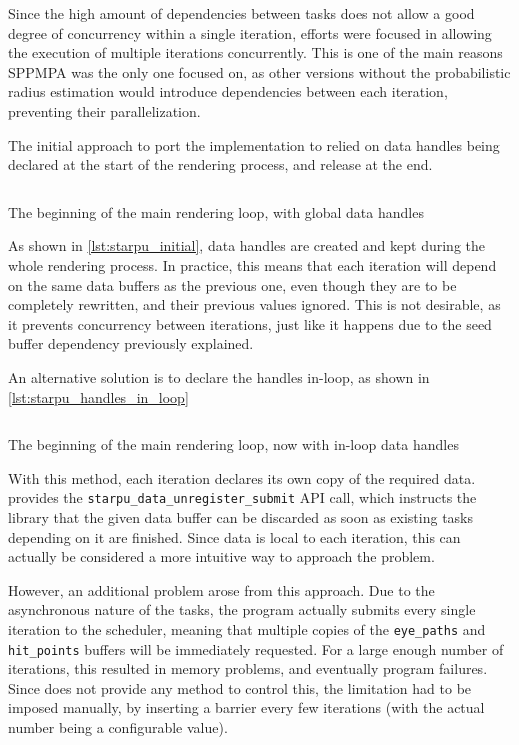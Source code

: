 \documentclass[main.tex]{subfiles}
\begin{document}
Since the high amount of dependencies between tasks does not allow a good degree of concurrency within a single iteration, efforts were focused in allowing the execution of multiple iterations concurrently. This is one of the main reasons SPPMPA was the only one focused on, as other versions without the probabilistic radius estimation would introduce dependencies between each iteration, preventing their parallelization.

The initial approach to port the implementation to \starpu relied on data handles being declared at the start of the rendering process, and release at the end.

\begin{listing}[htp]
  \inputminted[linenos,tabsize=4]{c++}{code/starpu_initial.cpp}

  \caption{The beginning of the main rendering loop, with global data handles}
  \label{lst:starpu_initial}
\end{listing}

As shown in \cref{lst:starpu_initial}, data handles are created and kept during the whole rendering process. In practice, this means that each iteration will depend on the same data buffers as the previous one, even though they are to be completely rewritten, and their previous values ignored. This is not desirable, as it prevents concurrency between iterations, just like it happens due to the seed buffer dependency previously explained.

An alternative solution is to declare the handles in-loop, as shown in \cref{lst:starpu_handles_in_loop}

\begin{listing}[htp]
  \inputminted[linenos,tabsize=4]{c++}{code/starpu_handles_in_loop.cpp}

  \caption{The beginning of the main rendering loop, now with in-loop data handles}
  \label{lst:starpu_handles_in_loop}
\end{listing}

With this method, each iteration declares its own copy of the required data. \starpu provides the \texttt{starpu\_data\_unregister\_submit} API call, which instructs the library that the given data buffer can be discarded as soon as existing tasks depending on it are finished. Since data is local to each iteration, this can actually be considered a more intuitive way to approach the problem.

However, an additional problem arose from this approach. Due to the asynchronous nature of the tasks, the program actually submits every single iteration to the scheduler, meaning that multiple copies of the \texttt{eye\_paths} and \texttt{hit\_points} buffers will be immediately requested. For a large enough number of iterations, this resulted in memory problems, and eventually program failures. Since \starpu does not provide any method to control this, the limitation had to be imposed manually, by inserting a barrier every few iterations (with the actual number being a configurable value).
\end{document}
